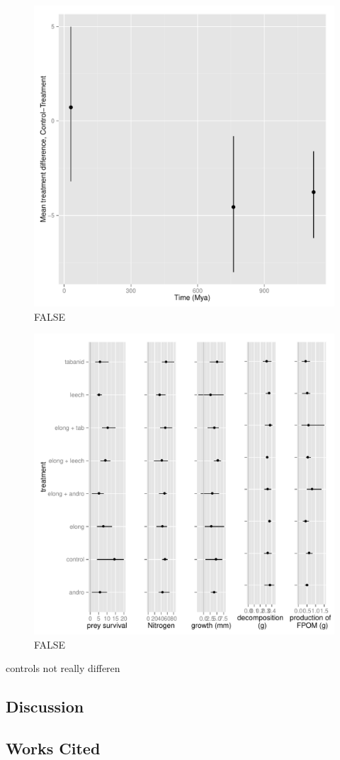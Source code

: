 \begin{figure}[htbp]
\centering
\includegraphics{figure/FIG_PD_experiment_nonadditive.pdf}
\caption{FALSE}
\end{figure}

\begin{figure}[htbp]
\centering
\includegraphics{figure/FIG_experiment_responses.pdf}
\caption{FALSE}
\end{figure}

controls not really differen

\subsection{Discussion}

\subsection{Works Cited}
